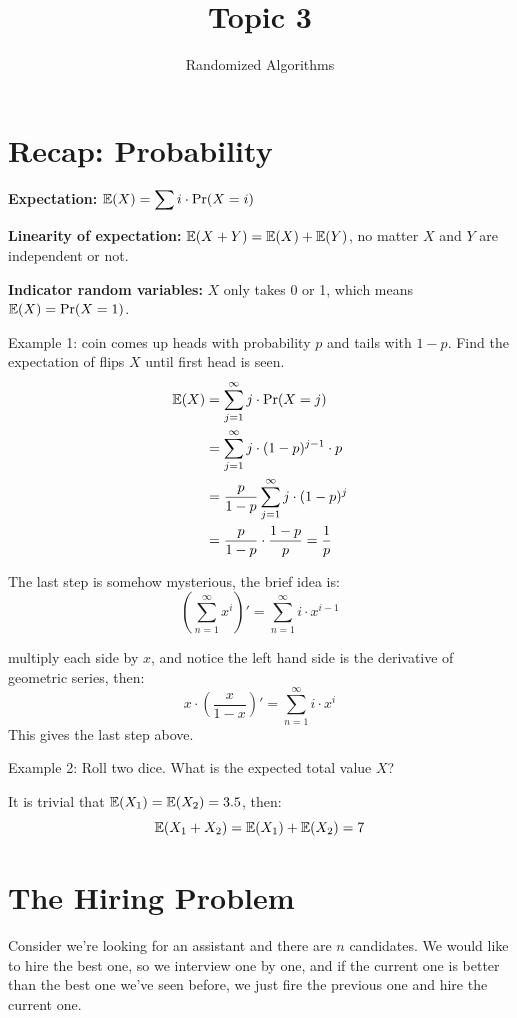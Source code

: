 \documentclass[11pt, a4paper]{COMP3711}
\title{Topic 3}
\subtitle{Randomized Algorithms}
\begin{document}
\begin{spacing}{1.5}
    
    \section{Recap: Probability}

    {\bf Expectation: } $\displaystyle \mathbb{E}(X)=\sum i\cdot \Pr(X=i)$

    {\bf Linearity of expectation: } $\mathbb{E}(X+Y)=\mathbb{E}(X)+\mathbb{E}(Y)$, 
    no matter $X$ and $Y$ are independent or not.

    {\bf Indicator random variables:} $X$ only takes 
    0 or 1, which means $\mathbb{E}(X)=\Pr(X=1)$.

    Example 1: coin comes up heads with probability $p$ and 
    tails with $1-p$. Find the expectation of flips $X$ 
    until first head is seen.
    \begin{align*}
        \mathbb{E}(X)&=\sum_{j=1}^{\infty} j\cdot \Pr(X=j)\\
        &= \sum_{j=1}^{\infty}j\cdot (1-p)^{j-1}\cdot p\\
        &= \frac{p}{1-p} \sum_{j=1}^{\infty}j\cdot (1-p)^{j}\\
        &= \frac{p}{1-p}\cdot \frac{1-p}{p} =\frac{1}{p}
    \end{align*}

    The last step is somehow mysterious, the brief idea is: 
    $$\left(\sum_{n=1}^{\infty} x^i\right)'=\sum_{n=1}^{\infty}i\cdot x^{i-1}$$

    multiply each side by $x$, and notice the left hand side is the 
    derivative of geometric series, then: 
    $$x\cdot \left(\frac{x}{1-x}\right)'=\sum_{n=1}^{\infty}i\cdot x^{i}$$
    This gives the last step above.

    Example 2: Roll two dice. What is the expected total value $X$?

    It is trivial that $\mathbb{E}(X_1)=\mathbb{E}(X_2)=3.5$, then: 
    $$\mathbb{E}(X_1+X_2)=\mathbb{E}(X_1)+\mathbb{E}(X_2)=7$$

    \section{The Hiring Problem}

    Consider we're looking for an assistant and there are $n$ 
    candidates. We would like to hire the best one, so we 
    interview one by one, and if the current one is better than 
    the best one we've seen before, we just fire the previous one 
    and hire the current one.


\end{spacing}
\end{document}
